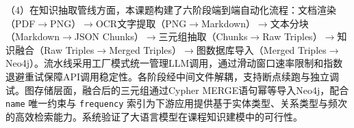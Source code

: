 （4）在知识抽取管线方面，本课题构建了六阶段端到端自动化流程：文档渲染（PDF$\rightarrow$PNG）$\rightarrow$OCR文字提取（PNG$\rightarrow$Markdown）$\rightarrow$文本分块（Markdown$\rightarrow$JSON Chunks）$\rightarrow$三元组抽取（Chunks$\rightarrow$Raw Triples）$\rightarrow$知识融合（Raw Triples$\rightarrow$Merged Triples）$\rightarrow$图数据库导入（Merged Triples$\rightarrow$Neo4j）。流水线采用工厂模式统一管理LLM调用，通过滑动窗口速率限制和指数退避重试保障API调用稳定性。各阶段经中间文件解耦，支持断点续跑与独立调试。图存储层面，融合后的三元组通过Cypher MERGE语句幂等导入Neo4j，配合 \texttt{name} 唯一约束与 \texttt{frequency} 索引为下游应用提供基于实体类型、关系类型与频次的高效检索能力。系统验证了大语言模型在课程知识建模中的可行性。

